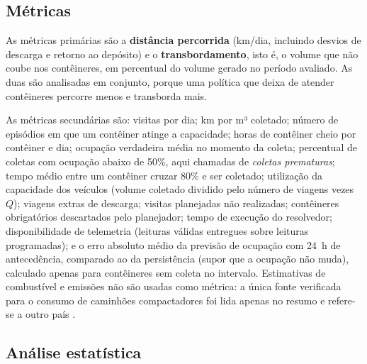 \subsection{Métricas}

As métricas primárias são a \textbf{distância percorrida} (km/dia, incluindo
desvios de descarga e retorno ao depósito) e o \textbf{transbordamento}, isto
é, o volume que não coube nos contêineres, em percentual do volume gerado no
período avaliado. As duas são analisadas em conjunto, porque uma política que
deixa de atender contêineres percorre menos e transborda mais.

As métricas secundárias são: visitas por dia; km por m³ coletado; número de
episódios em que um contêiner atinge a capacidade; horas de contêiner cheio
por contêiner e dia; ocupação verdadeira média no momento da coleta;
percentual de coletas com ocupação abaixo de 50\%, aqui chamadas de
\emph{coletas prematuras}; tempo médio entre um contêiner cruzar 80\% e ser
coletado; utilização da capacidade dos veículos (volume coletado dividido
pelo número de viagens vezes $Q$); viagens extras de descarga; visitas
planejadas não realizadas; contêineres obrigatórios descartados pelo
planejador; tempo de execução do resolvedor; disponibilidade de telemetria
(leituras válidas entregues sobre leituras programadas); e o erro absoluto
médio da previsão de ocupação com 24~h de antecedência, comparado ao da
persistência (supor que a ocupação não muda), calculado apenas para
contêineres sem coleta no intervalo. Estimativas de combustível e emissões não
são usadas como métrica: a única fonte verificada para o consumo de
caminhões compactadores foi lida apenas no resumo e refere-se a outro país
\cite{nguyen2010fuel}.

\subsection{Análise estatística}

